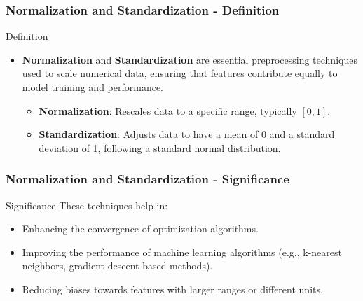 \documentclass[aspectratio=169]{beamer}
\begin{document}
\begin{frame}[fragile]
    \frametitle{Normalization and Standardization - Definition}
    \begin{block}{Definition}
        \begin{itemize}
            \item \textbf{Normalization} and \textbf{Standardization} are essential preprocessing techniques used to scale numerical data, ensuring that features contribute equally to model training and performance.
            \begin{itemize}
                \item \textbf{Normalization}: Rescales data to a specific range, typically \([0, 1]\).
                \item \textbf{Standardization}: Adjusts data to have a mean of 0 and a standard deviation of 1, following a standard normal distribution.
            \end{itemize}
        \end{itemize}
    \end{block}
\end{frame}

\begin{frame}[fragile]
    \frametitle{Normalization and Standardization - Significance}
    \begin{block}{Significance}
        These techniques help in:
        \begin{itemize}
            \item Enhancing the convergence of optimization algorithms.
            \item Improving the performance of machine learning algorithms (e.g., k-nearest neighbors, gradient descent-based methods).
            \item Reducing biases towards features with larger ranges or different units.
        \end{itemize}
    \end{block}
\end{frame}
\end{document}

